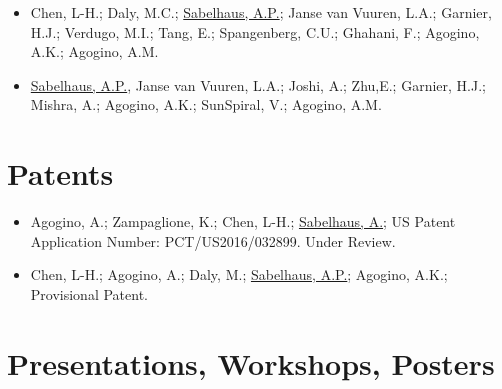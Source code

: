 \documentclass[letterpaper]{deedy-resume} %
\begin{document}
\begin{itemize}

\item {} Chen, L-H.;  Daly, M.C.; \underline{Sabelhaus, A.P.}; Janse van Vuuren, L.A.; Garnier, H.J.; Verdugo, M.I.; Tang, E.; Spangenberg, C.U.; Ghahani, F.; Agogino, A.K.; Agogino, A.M.

\item {} \underline{Sabelhaus, A.P.}, Janse van Vuuren, L.A.; Joshi, A.; Zhu,E.; Garnier, H.J.; Mishra, A.; Agogino, A.K.; SunSpiral, V.; Agogino, A.M.

\end{itemize}


\section{Patents}

\vspace{0.2cm}

\begin{itemize}

\item {} Agogino, A.; Zampaglione, K.; Chen, L-H.; \underline{Sabelhaus, A.}; US Patent Application Number: PCT/US2016/032899. Under Review.

\item {} Chen, L-H.; Agogino, A.; Daly, M.; \underline{Sabelhaus, A.P.}; Agogino, A.K.; Provisional Patent.

\end{itemize}



\section{Presentations, Workshops, Posters}
\end{document}
